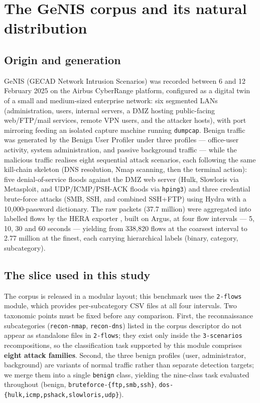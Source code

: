 \documentclass[review,12pt]{elsarticle}
\begin{document}
\section{The GeNIS corpus and its natural distribution}
\label{sec:corpus}

\subsection{Origin and generation}
GeNIS (GECAD Network Intrusion Scenarios) \cite{silva2025genis} was recorded
between 6 and 12 February 2025 on the Airbus CyberRange platform, configured
as a digital twin of a small and medium-sized enterprise network: six
segmented LANs (administration, users, internal servers, a DMZ hosting
public-facing web/FTP/mail services, remote VPN users, and the attacker
hosts), with port mirroring feeding an isolated capture machine running
\texttt{dumpcap}. Benign traffic was generated by the Benign User Profiler
\cite{shafi2024bup} under three profiles --- office-user activity, system
administration, and passive background traffic --- while the malicious
traffic realises eight sequential attack scenarios, each following the same
kill-chain skeleton (DNS resolution, Nmap scanning, then the terminal
action): five denial-of-service floods against the DMZ web server (Hulk,
Slowloris via Metasploit, and UDP/ICMP/PSH-ACK floods via
\texttt{hping3}) and three credential brute-force attacks (SMB, SSH, and
combined SSH+FTP) using Hydra with a 10,000-password dictionary. The raw
packets (37.7 million) were aggregated into labelled flows by the HERA
exporter \cite{pinto2024hera}, built on Argus, at four flow intervals ---
5, 10, 30 and 60 seconds --- yielding from 338{,}820 flows at the coarsest interval to
2.77 million at the finest, each carrying hierarchical labels (binary, category,
subcategory).

\subsection{The slice used in this study}
The corpus is released in a modular layout; this benchmark uses the
\texttt{2-flows} module, which provides per-subcategory CSV files at all
four intervals. Two taxonomic points must be fixed before any comparison.
First, the reconnaissance subcategories (\texttt{recon-nmap},
\texttt{recon-dns}) listed in the corpus descriptor do not appear as
standalone files in \texttt{2-flows}; they exist only inside the
\texttt{3-scenarios} recompositions, so the classification task supported
by this module comprises \textbf{eight attack families}. Second, the three
benign profiles (user, administrator, background) are variants of normal
traffic rather than separate detection targets; we merge them into a single
\texttt{benign} class, yielding the nine-class task evaluated throughout
(benign, \texttt{bruteforce-\{ftp,smb,ssh\}},
\texttt{dos-\{hulk,icmp,pshack,slowloris,udp\}}).
\end{document}
